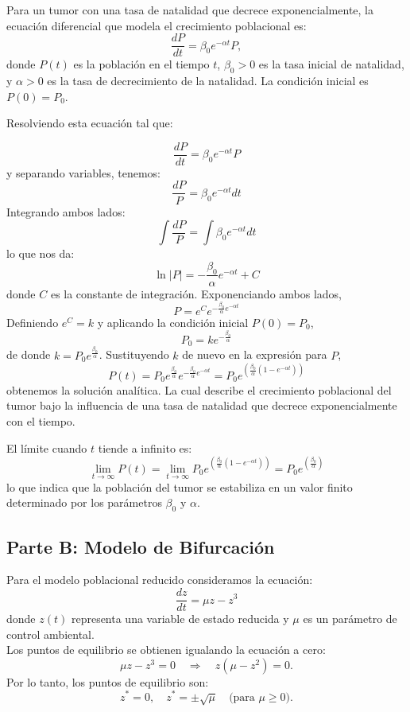 \documentclass[a4paper,10pt,twocolumn]{article}
\begin{document}
Para un tumor con una tasa de natalidad que decrece exponencialmente, la ecuación diferencial que modela el crecimiento poblacional es:
\[\frac{dP}{dt} = \beta_0 e^{-\alpha t} P,\]
donde \(P(t)\) es la población en el tiempo \(t\), \(\beta_0 > 0\) es la tasa inicial de natalidad, y \(\alpha  > 0\) es la tasa de decrecimiento de la natalidad. La condición inicial es \(P(0) = P_0\).

Resolviendo esta ecuación tal que: 

\[\frac{dP}{dt} = \beta_0 e^{-\alpha t} P\]
y separando variables, tenemos:
\[\frac{dP}{P} = \beta_0 e^{-\alpha t} dt\]
Integrando ambos lados:
\[\int \frac{dP}{P} = \int \beta_0 e^{-\alpha t} dt\]
lo que nos da:
\[\ln|P| = -\frac{\beta_0}{\alpha} e^{-\alpha t} + C\]
donde \(C\) es la constante de integración.
Exponenciando ambos lados,
\[P = e^C e^{-\frac{\beta_0}{\alpha} e^{-\alpha t}}\]
Definiendo \(e^C = k\) y aplicando la condición inicial \(P(0) = P_0\),
\[P_0 = k e^{-\frac{\beta_0}{\alpha}}\]
de donde \(k = P_0 e^{\frac{\beta_0}{\alpha}}\).
Sustituyendo \(k\) de nuevo en la expresión para \(P\),
\[P(t) = P_0 e^{\frac{\beta_0}{\alpha}} e^{-\frac{\beta_0}{\alpha} e^{-\alpha t}} = P_0 e^{\left(\frac{\beta_0}{\alpha}(1 - e^{-\alpha t})\right)}\]
obtenemos la solución analítica.
La cual describe el crecimiento poblacional del tumor bajo la influencia de una tasa de natalidad que decrece exponencialmente con el tiempo.

El límite cuando \(t\) tiende a infinito es:
\[\lim_{t \to \infty} P(t) = \lim_{t \to \infty} P_0 e^{\left(\frac{\beta_0}{\alpha}(1 - e^{-\alpha t})\right)} = P_0 e^{\left(\frac{\beta_0}{\alpha}\right)}\]
lo que indica que la población del tumor se estabiliza en un valor finito determinado por los parámetros \(\beta_0\) y \(\alpha\).

\subsection{Parte B: Modelo de Bifurcación}\label{subsec:parte-b}


Para el modelo poblacional reducido consideramos la ecuación:
\[\frac{dz}{dt} = \mu z - z^3\]
donde \(z(t)\) representa una variable de estado reducida y \(\mu\) es un parámetro de control ambiental.
\\
Los puntos de equilibrio se obtienen igualando la ecuación a cero:
\[\mu z - z^3 = 0 \quad \Rightarrow \quad z(\mu - z^2) = 0.\]
Por lo tanto, los puntos de equilibrio son:
\[z^* = 0, \quad z^* = \pm\sqrt{\mu} \quad \text{(para \(\mu \geq 0\))}.\]
\end{document}
